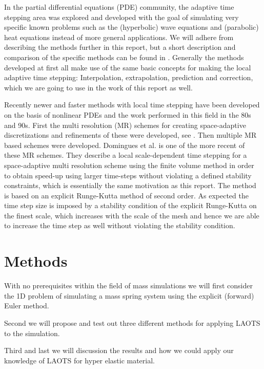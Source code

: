 \documentclass[twoside]{article}
\begin{document}
\begin{multicols}{2}
In the partial differential equations (PDE) community, the adaptive time
stepping area was explored and developed with the goal of simulating
very specific known problems such as the (hyperbolic) wave equations
and (parabolic) heat equations instead of more general applications. We
will adhere from describing the methods further in this report, but a
short description and comparison of the specific methods can be found in
\cite{Gander:2013}. Generally the methods developed at first all make use
of the same basic concepts for making the local adaptive time stepping:
Interpolation, extrapolation, prediction and correction, which we are going to
use in the work of this report as well.

Recently newer and faster methods with local time stepping have been developed
on the basis of nonlinear PDEs and the work performed in this field in
the 80s and 90s. First the multi resolution (MR) schemes for creating
space-adaptive discretizations and refinements of these were developed, see
\cite{Berger:1984}. Then multiple MR based schemes were developed. Domingues
et al. \cite{Domingues:2008} is one of the more recent of these MR schemes.
They describe a local scale-dependent time stepping for a space-adaptive multi
resolution scheme using the finite volume method in order to obtain speed-up
using larger time-steps without violating a defined stability constraints,
which is essentially the same motivation as this report. The method is based
on an explicit Runge-Kutta method of second order. As expected the time step
size is imposed by a stability condition of the explicit Runge-Kutta on the
finest scale, which increases with the scale of the mesh and hence we are able
to increase the time step as well without violating the stability condition.



\section{Methods}

With no prerequisites within the field of mass simulations we will first
consider the 1D problem of simulating a mass spring system using the explicit
(forward) Euler method.

Second we will propose and test out three different methods for applying LAOTS
to the simulation.

Third and last we will discussion the results and how we
could apply our knowledge of LAOTS for hyper elastic material.


\end{multicols}
\end{document}
